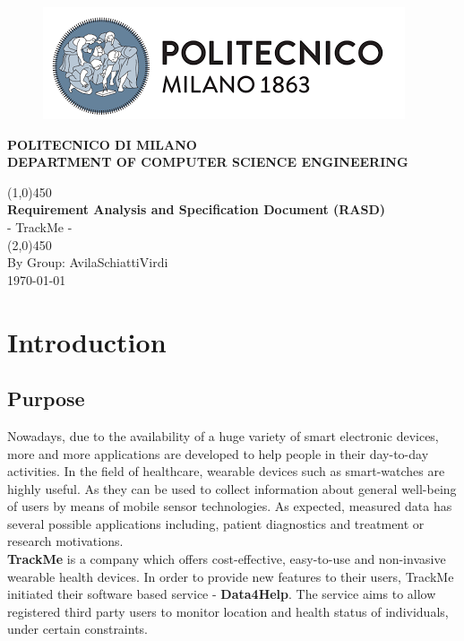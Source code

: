 \documentclass[12pt]{article}
\begin{document}
\begin{titlepage}
\begin{center}
\begin{figure}[h]
\includegraphics[scale=1]{Assets/PolimiLogo.png}
\centering
\end{figure}
\centering\textbf{POLITECNICO DI MILANO}\\
\centering\textbf{DEPARTMENT OF COMPUTER SCIENCE ENGINEERING}
\vspace*{4cm}

\line(1,0){450}\\
\Large{\textbf{Requirement Analysis and Specification Document (RASD)}}\\[3mm]
\Large{- TrackMe -}\\
\line(2,0){450}\\
\vfill
By Group: AvilaSchiattiVirdi\\


\today
\end{center}
\end{titlepage}

\tableofcontents
\thispagestyle{empty}
\newpage
\listoffigures
\listoftables
\thispagestyle{empty}
\clearpage
\setcounter{page}{1}

\section{Introduction}
\subsection{Purpose}
Nowadays, due to the availability of a huge variety of smart electronic devices, more and more applications are developed to help people in their day-to-day activities. In the field of healthcare, wearable devices such as smart-watches are highly useful. As they can be used to collect information about general well-being of users by means of mobile sensor technologies. As expected, measured data has several possible applications including, patient diagnostics and treatment or research motivations. \\

\textbf{TrackMe} is a company which offers cost-effective, easy-to-use and non-invasive wearable health devices. In order to provide new features to their users, TrackMe initiated their software based service - \textbf{Data4Help}. The service aims to allow registered third party users to monitor location and health status of individuals, under certain constraints. \\
\end{document}
